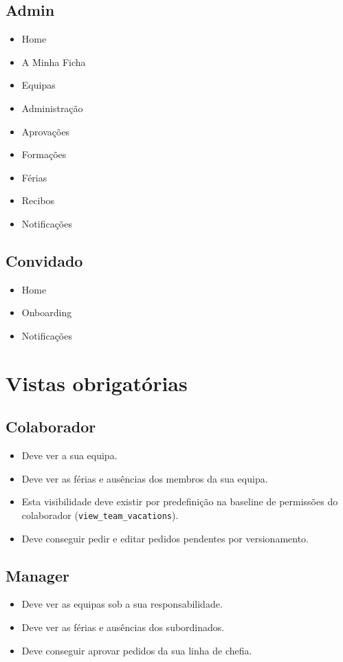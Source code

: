 \documentclass[11pt,a4paper]{article}
\begin{document}
\subsection{Admin}
\begin{itemize}
  \item Home
  \item A Minha Ficha
  \item Equipas
  \item Administração
  \item Aprovações
  \item Formações
  \item Férias
  \item Recibos
  \item Notificações
\end{itemize}

\subsection{Convidado}
\begin{itemize}
  \item Home
  \item Onboarding
  \item Notificações
\end{itemize}

\section{Vistas obrigatórias}

\subsection{Colaborador}
\begin{itemize}
  \item Deve ver a sua equipa.
  \item Deve ver as férias e ausências dos membros da sua equipa.
  \item Esta visibilidade deve existir por predefinição na baseline de permissões do colaborador (\texttt{view\_team\_vacations}).
  \item Deve conseguir pedir e editar pedidos pendentes por versionamento.
\end{itemize}

\subsection{Manager}
\begin{itemize}
  \item Deve ver as equipas sob a sua responsabilidade.
  \item Deve ver as férias e ausências dos subordinados.
  \item Deve conseguir aprovar pedidos da sua linha de chefia.
\end{itemize}
\end{document}
